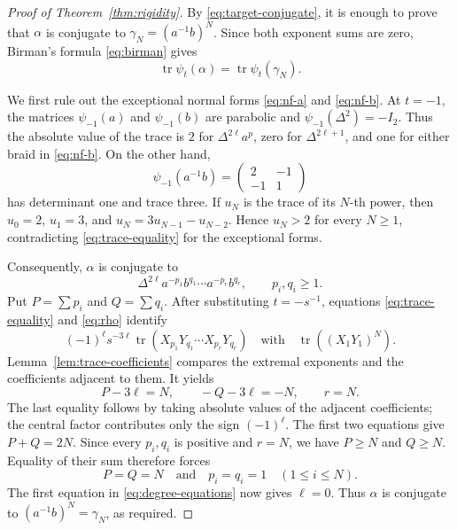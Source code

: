 \documentclass[11pt]{amsart}
\theoremstyle{remark}
\newcommand{\tr}{\operatorname{tr}}
\begin{document}
\begin{proof}[Proof of Theorem~\ref{thm:rigidity}]
By \eqref{eq:target-conjugate}, it is enough to prove that \(\alpha\) is conjugate to
\(\gamma_N=(a^{-1}b)^N\).  Since both exponent sums are zero, Birman's formula
\eqref{eq:birman} gives
\begin{equation}\label{eq:trace-equality}
  \tr\psi_t(\alpha)=\tr\psi_t(\gamma_N).
\end{equation}

We first rule out the exceptional normal forms \eqref{eq:nf-a} and
\eqref{eq:nf-b}.  At \(t=-1\), the matrices \(\psi_{-1}(a)\) and
\(\psi_{-1}(b)\) are parabolic and \(\psi_{-1}(\Delta^2)=-I_2\).  Thus the
absolute value of the trace is \(2\) for \(\Delta^{2\ell}a^p\), zero for
\(\Delta^{2\ell+1}\), and one for either braid in \eqref{eq:nf-b}.  On the other
hand,
\[
  \psi_{-1}(a^{-1}b)
  =\begin{pmatrix}2&-1\\-1&1\end{pmatrix}
\]
has determinant one and trace three.  If \(u_N\) is the trace of its \(N\)-th
power, then \(u_0=2\), \(u_1=3\), and
\(u_N=3u_{N-1}-u_{N-2}\).  Hence \(u_N>2\) for every \(N\geq1\), contradicting
\eqref{eq:trace-equality} for the exceptional forms.

Consequently, \(\alpha\) is conjugate to
\[
  \Delta^{2\ell}a^{-p_1}b^{q_1}\cdots a^{-p_r}b^{q_r},
  \qquad p_i,q_i\geq1.
\]
Put \(P=\sum p_i\) and \(Q=\sum q_i\).  After substituting \(t=-s^{-1}\),
equations \eqref{eq:trace-equality} and \eqref{eq:rho} identify
\[
  (-1)^\ell s^{-3\ell}
  \tr(X_{p_1}Y_{q_1}\cdots X_{p_r}Y_{q_r})
  \quad\text{with}\quad
  \tr((X_1Y_1)^N).
\]
Lemma~\ref{lem:trace-coefficients} compares the extremal exponents and the
coefficients adjacent to them.  It yields
\begin{equation}\label{eq:degree-equations}
  P-3\ell=N,
  \qquad -Q-3\ell=-N,
  \qquad r=N.
\end{equation}
The last equality follows by taking absolute values of the adjacent coefficients;
the central factor contributes only the sign \((-1)^\ell\).  The first two equations
give \(P+Q=2N\).  Since every \(p_i,q_i\) is positive and \(r=N\), we have
\(P\geq N\) and \(Q\geq N\).  Equality of their sum therefore forces
\[
  P=Q=N
  \quad\text{and}\quad
  p_i=q_i=1\quad(1\leq i\leq N).
\]
The first equation in \eqref{eq:degree-equations} now gives \(\ell=0\).  Thus
\(\alpha\) is conjugate to \((a^{-1}b)^N=\gamma_N\), as required.
\end{proof}
\end{document}
